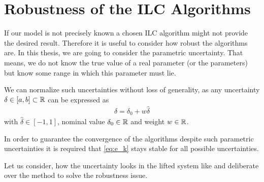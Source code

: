 \chapter{Robustness of the ILC Algorithms}
If our model is not precisely known a chosen ILC algorithm might not provide the desired result. 
Therefore it is useful to consider how robust the algorithms are. 
In this thesis, we are going to consider the parametric uncertainty. That means, we do not know the true value of a real parameter (or the parameters) but know some range in which this parameter must lie. 

We can normalize such uncertainties without loss of generality, as any uncertainty $\delta \in [a,b] \subset {\mathbb{R}}$ can be expressed as 
\begin{align}
\label{eq:rob:del=del0+...}
\delta = \delta_0 + w \hat{\delta}
\end{align}
with $\hat{\delta} \in [-1,1]$, nominal value $\delta_0 \in {\mathbb{R}}$ and weight $w\in {\mathbb{R}}$. 

%

In order to guarantee the convergence of the algorithms despite such parametric uncertainties it is required that \eqref{eq:e_k}  stays stable for all possible uncertainties. 

Let us consider, how the uncertainty looks in the lifted system like and deliberate over the method to solve the robustness issue. 





